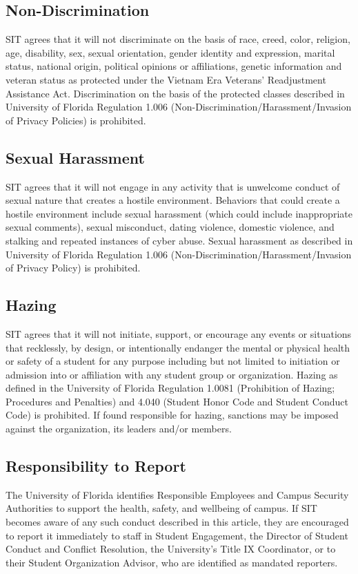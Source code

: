 \documentclass{article}
\def\clubname{SIT }
\begin{document}
\subsection{Non-Discrimination}
\clubname agrees that it will not discriminate on the basis of race, creed, color, religion, age, disability, sex, sexual orientation, gender identity and expression, marital status, national origin, political opinions or affiliations, genetic information and veteran status as protected under the Vietnam Era Veterans' Readjustment Assistance Act. Discrimination on the basis of the protected classes described in University of Florida Regulation 1.006 (Non-Discrimination/Harassment/Invasion of Privacy Policies) is prohibited.

\subsection{Sexual Harassment}

\clubname agrees that it will not engage in any activity that is unwelcome conduct of sexual nature that creates a hostile environment. Behaviors that could create a hostile environment include sexual harassment (which could include inappropriate sexual comments), sexual misconduct, dating violence, domestic violence, and stalking and repeated instances of cyber abuse. Sexual harassment as described in University of Florida Regulation 1.006 (Non-Discrimination/Harassment/Invasion of Privacy Policy) is prohibited.

\subsection{Hazing}
\clubname agrees that it will not initiate, support, or encourage any events or situations that recklessly, by design, or intentionally endanger the mental or physical health or safety of a student for any purpose including but not limited to initiation or admission into or affiliation with any student group or organization. Hazing as defined in the University of Florida Regulation 1.0081 (Prohibition of Hazing; Procedures and Penalties) and 4.040 (Student Honor Code and Student Conduct Code) is prohibited. If found responsible for hazing, sanctions may be imposed against the organization, its leaders and/or members.

\subsection{Responsibility to Report}
The University of Florida identifies Responsible Employees and Campus Security Authorities to support the health, safety, and wellbeing of campus. If \clubname becomes aware of any such conduct described in this article, they are encouraged to report it immediately to staff in Student Engagement, the Director of Student Conduct and Conflict Resolution, the University’s Title IX Coordinator, or to their Student Organization Advisor, who are identified as mandated reporters.
\end{document}
